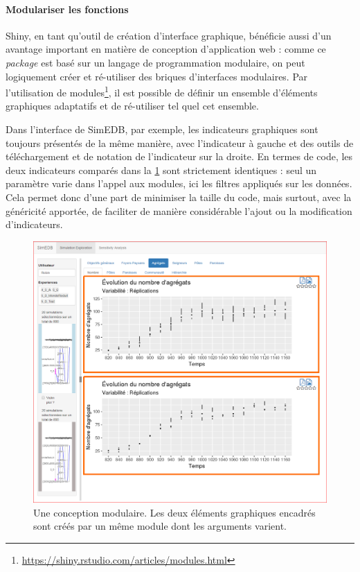 			\paragraph*{Modulariser les fonctions}
			
			Shiny, en tant qu'outil de création d'interface graphique, bénéficie aussi d'un avantage important en matière de conception d'application web : comme ce \textit{package} est basé sur un langage de programmation modulaire, on peut logiquement créer et ré-utiliser des \og briques d'interfaces\fg{} modulaires.
			Par l'utilisation de modules\footnote{\href{https://shiny.rstudio.com/articles/modules.html}{https://shiny.rstudio.com/articles/modules.html}}, il est possible de définir un ensemble d'éléments graphiques adaptatifs et de ré-utiliser tel quel cet ensemble.
			
			Dans l'interface de SimEDB, par exemple, les indicateurs graphiques sont toujours présentés de la même manière, avec l'indicateur à gauche et des outils de téléchargement et de notation de l'indicateur sur la droite.
			En termes de code, les deux indicateurs comparés dans la \cref{fig:simedb-modules} sont strictement identiques : seul un paramètre varie dans l'appel aux modules, ici les filtres appliqués sur les données.
			Cela permet donc d'une part de minimiser la taille du code, mais surtout, avec la généricité apportée, de faciliter de manière considérable l'ajout ou la modification d'indicateurs.
			
			\begin{figure}[H]
				\centering
				\includegraphics[width=\linewidth]{img/SimEDB_modules.png}
				\caption{Une conception modulaire. Les deux éléments graphiques encadrés sont créés par un même \og module\fg{} dont les arguments varient.}
				\label{fig:simedb-modules}
			\end{figure}


